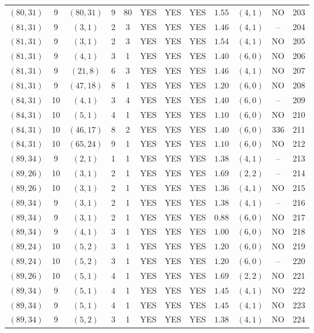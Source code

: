 \begin{longtable}{|c|c|c|c|c|c|c|c|c|c|c|c|}
$(80,31)$ & 9 & $(80,31)$ & 9 & 80 & YES & YES & YES & $1.55$ & $(4,1)$ & NO & 203\\
$(81,31)$ & 9 & $(3,1)$ & 2 & 3 & YES & YES & YES & $1.46$ & $(4,1)$ & -- & 204\\
$(81,31)$ & 9 & $(3,1)$ & 2 & 3 & YES & YES & YES & $1.54$ & $(4,1)$ & NO & 205\\
$(81,31)$ & 9 & $(4,1)$ & 3 & 1 & YES & YES & YES & $1.40$ & $(6,0)$ & NO & 206\\
$(81,31)$ & 9 & $(21,8)$ & 6 & 3 & YES & YES & YES & $1.46$ & $(4,1)$ & NO & 207\\
$(81,31)$ & 9 & $(47,18)$ & 8 & 1 & YES & YES & YES & $1.20$ & $(6,0)$ & NO & 208\\
$(84,31)$ & 10 & $(4,1)$ & 3 & 4 & YES & YES & YES & $1.40$ & $(6,0)$ & -- & 209\\
$(84,31)$ & 10 & $(5,1)$ & 4 & 1 & YES & YES & YES & $1.10$ & $(6,0)$ & NO & 210\\
$(84,31)$ & 10 & $(46,17)$ & 8 & 2 & YES & YES & YES & $1.40$ & $(6,0)$ & 336 & 211\\
$(84,31)$ & 10 & $(65,24)$ & 9 & 1 & YES & YES & YES & $1.10$ & $(6,0)$ & NO & 212\\
$(89,34)$ & 9 & $(2,1)$ & 1 & 1 & YES & YES & YES & $1.38$ & $(4,1)$ & -- & 213\\
$(89,26)$ & 10 & $(3,1)$ & 2 & 1 & YES & YES & YES & $1.69$ & $(2,2)$ & -- & 214\\
$(89,26)$ & 10 & $(3,1)$ & 2 & 1 & YES & YES & YES & $1.36$ & $(4,1)$ & NO & 215\\
$(89,34)$ & 9 & $(3,1)$ & 2 & 1 & YES & YES & YES & $1.38$ & $(4,1)$ & -- & 216\\
$(89,34)$ & 9 & $(3,1)$ & 2 & 1 & YES & YES & YES & $0.88$ & $(6,0)$ & NO & 217\\
$(89,34)$ & 9 & $(4,1)$ & 3 & 1 & YES & YES & YES & $1.00$ & $(6,0)$ & NO & 218\\
$(89,24)$ & 10 & $(5,2)$ & 3 & 1 & YES & YES & YES & $1.20$ & $(6,0)$ & NO & 219\\
$(89,24)$ & 10 & $(5,2)$ & 3 & 1 & YES & YES & YES & $1.20$ & $(6,0)$ & -- & 220\\
$(89,26)$ & 10 & $(5,1)$ & 4 & 1 & YES & YES & YES & $1.69$ & $(2,2)$ & NO & 221\\
$(89,34)$ & 9 & $(5,1)$ & 4 & 1 & YES & YES & YES & $1.45$ & $(4,1)$ & NO & 222\\
$(89,34)$ & 9 & $(5,1)$ & 4 & 1 & YES & YES & YES & $1.45$ & $(4,1)$ & NO & 223\\
$(89,34)$ & 9 & $(5,2)$ & 3 & 1 & YES & YES & YES & $1.38$ & $(4,1)$ & NO & 224\\

\end{longtable}
